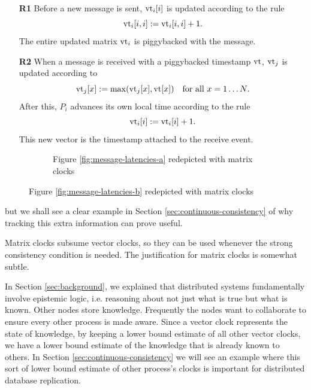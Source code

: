 \documentclass[]             %
{NASA}                       %
\theoremstyle{definition}
\begin{document}
\begin{enumerate}
\item[\textbf{R1}] Before a new message is sent, $\textrm{vt}_i[i]$ is updated according to the rule
  \[\textrm{vt}_i[i,i] := \textrm{vt}_i[i,i] + 1.\]
  The entire updated matrix $\textrm{vt}_i$ is piggybacked with the message.
\item[\textbf{R2}] When a message is received with a piggybacked timestamp $\textrm{vt}$,
  $\textrm{vt}_j$ is updated according to
  \[\textrm{vt}_j[x] := \max(\textrm{vt}_j[x], \textrm{vt}[x]) \quad \textrm{for all $x = 1\ldots N$}.\]
  After this, $P_i$ advances its own local time according to the rule
  \[ \textrm{vt}_i[i] := \textrm{vt}_i[i] + 1.\]
  This new vector is the timestamp attached to the receive event.
\end{enumerate}

\begin{figure}[p]
  \begin{subfigure}{1\textwidth}
    \centering
    
    \caption{Figure \ref{fig:message-latencies-a} redepicted with matrix clocks}
    \label{fig:message-latencies-matrix-a}
  \end{subfigure}
  \begin{subfigure}{1\textwidth}
    
    \label{fig:message-latencies-matrix-b}
  \end{subfigure}
  \caption{Figure \ref{fig:message-latencies-b} redepicted with matrix clocks}
  \label{fig:message-latencies-matrix}
\end{figure}

\afterpage{\clearpage}

but we shall see a clear example in Section
\ref{sec:continuous-consistency} of why tracking this extra
information can prove useful.

Matrix clocks subsume vector clocks, so they can be used whenever the
strong consistency condition is needed. The justification for matrix
clocks is somewhat subtle.

In Section \ref{sec:background}, we explained that distributed systems
fundamentally involve epistemic logic, i.e. reasoning about not just
what is true but what is known. Other nodes store
knowledge. Frequently the nodes want to collaborate to ensure every
other process is made aware. Since a vector clock represents the state
of knowledge, by keeping a lower bound estimate of all other vector
clocks, we have a lower bound estimate of the knowledge that is
already known to others. In Section
\ref{sec:continuous-consistency} we will see an example where this
sort of lower bound estimate of other process's clocks is important
for distributed database replication.
\end{document}
